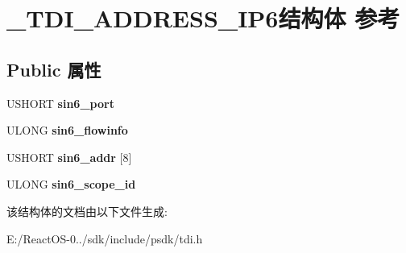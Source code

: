 \hypertarget{struct___t_d_i___a_d_d_r_e_s_s___i_p6}{}\section{\+\_\+\+T\+D\+I\+\_\+\+A\+D\+D\+R\+E\+S\+S\+\_\+\+I\+P6结构体 参考}
\label{struct___t_d_i___a_d_d_r_e_s_s___i_p6}
\subsection*{Public 属性}
\begin{DoxyCompactItemize}
\item 
\mbox{\label{struct___t_d_i___a_d_d_r_e_s_s___i_p6_a113eb1ac8b1be93b6c8a75dedf4e61c9}} 
U\+S\+H\+O\+RT {\bfseries sin6\+\_\+port}
\item 
\mbox{\label{struct___t_d_i___a_d_d_r_e_s_s___i_p6_acc06625805484dfce26c2530f7d6a649}} 
U\+L\+O\+NG {\bfseries sin6\+\_\+flowinfo}
\item 
\mbox{\label{struct___t_d_i___a_d_d_r_e_s_s___i_p6_ac5d54b385470004d6d535c39b1e1b49a}} 
U\+S\+H\+O\+RT {\bfseries sin6\+\_\+addr} \mbox{[}8\mbox{]}
\item 
\mbox{\label{struct___t_d_i___a_d_d_r_e_s_s___i_p6_a93ec36b3a6f0bb1f70f20d54c9941bfc}} 
U\+L\+O\+NG {\bfseries sin6\+\_\+scope\+\_\+id}
\end{DoxyCompactItemize}


该结构体的文档由以下文件生成\+:\begin{DoxyCompactItemize}
\item 
E\+:/\+React\+O\+S-\/0../sdk/include/psdk/tdi.\+h\end{DoxyCompactItemize}
